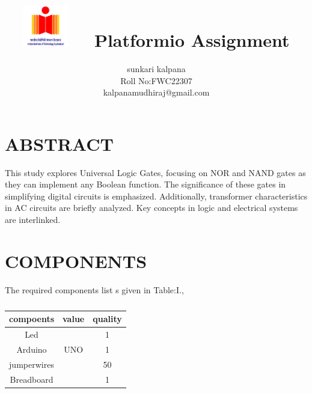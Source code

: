 \documentclass[conference]{IEEEtran}                   \IEEEoverridecommandlockouts
\title{                                               
\vspace{1cm}                                             {\includegraphics[width=0.15\textwidth]{1.jpg} \    \ Platformio Assignment} }
\author{sunkari kalpana \\ Roll No:FWC22307\\kalpanamudhiraj@gmail.com}
\begin{document}
                                        \maketitle                                                \section {ABSTRACT}
This study explores Universal Logic Gates, focusing on NOR and NAND gates as they can implement any Boolean function. The significance of these gates in simplifying digital circuits is emphasized. Additionally, transformer characteristics in AC circuits are briefly analyzed. Key concepts in logic and electrical systems are interlinked.

\section{COMPONENTS}
The required components list s given in Table:I.,
\vspace{0.3cm}
\begin{table} [htbp]
\centering
\begin{tabular}{| c| c | c |} \hline
compoents & value & quality \\\hline
Led & & 1 \\ \hline
Arduino & UNO & 1\\ \hline
jumperwires & & 50 \\ \hline
Breadboard & & 1 \\
\hline
\end{tabular}
\vspace{0.3cm}
\caption{\label{tab:widgets}}
\end{table}
\end{document}
